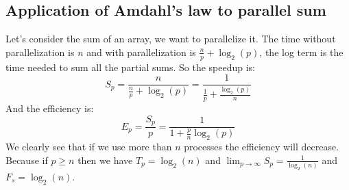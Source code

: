 \documentclass[12pt, openany]{report}
\theoremstyle{definition}
\begin{document}
\subsection{Application of Amdahl's law to parallel sum}
Let's consider the sum of an array, we want to parallelize it. The time without parallelization is $n$ and with parallelization is $\frac{n}{p} + \log_2(p)$, the log term is the time needed to sum all the partial sums. So the speedup is:
\begin{equation}
	S_p = \frac{n}{\frac{n}{p} + \log_2(p)} = \frac{1}{\frac{1}{p} + \frac{\log_2(p)}{n}}
\end{equation}
And the efficiency is:
\begin{equation}
	E_p = \frac{S_p}{p} = \frac{1}{1 + \frac{p}{n}\log_2(p)}
\end{equation}
We clearly see that if we use more than $n$ processes the efficiency will decrease. Because if $p \geq n$ then we have $T_p = \log_2(n)$ and $\lim_{p \to \infty} S_p = \frac{1}{\log_2(n)}$ and $F_s = \log_2(n)$.
\end{document}
